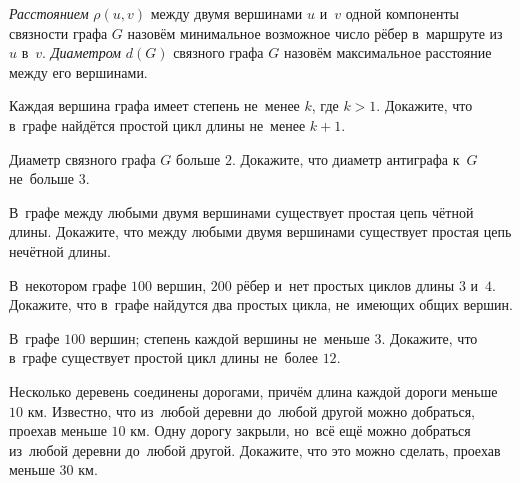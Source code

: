 


\emph{Расстоянием} $\rho(u, v)$ между двумя вершинами $u$ и~$v$ одной
компоненты связности графа $G$ назовём минимальное возможное число рёбер
в~маршруте из~$u$ в~$v$.
\emph{Диаметром} $d(G)$ связного графа $G$ назовём максимальное расстояние
между его вершинами.

\begin{problems}



\item
Каждая вершина графа имеет степень не~менее $k$, где $k > 1$.
Докажите, что в~графе найдётся простой цикл длины не~менее $k + 1$.

\item
Диаметр связного графа $G$ больше $2$.
Докажите, что диаметр антиграфа к~$G$ не~больше $3$.

\item
В~графе между любыми двумя вершинами существует простая цепь чётной длины.
Докажите, что между любыми двумя вершинами существует простая цепь нечётной
длины.

\item
В~некотором графе $100$ вершин, $200$ рёбер и~нет простых циклов длины $3$ и~$4$.
Докажите, что в~графе найдутся два простых цикла, не~имеющих общих вершин.

\item
В~графе $100$ вершин;
степень каждой вершины не~меньше $3$.
Докажите, что в~графе существует простой цикл длины не~более $12$.

\item
Несколько деревень соединены дорогами, причём длина каждой дороги меньше $10$
км.
Известно, что из~любой деревни до~любой другой можно добраться, проехав меньше
$10$ км.
Одну дорогу закрыли, но~всё ещё можно добраться из~любой деревни до~любой
другой.
Докажите, что это можно сделать, проехав меньше $30$ км.

\end{problems}

